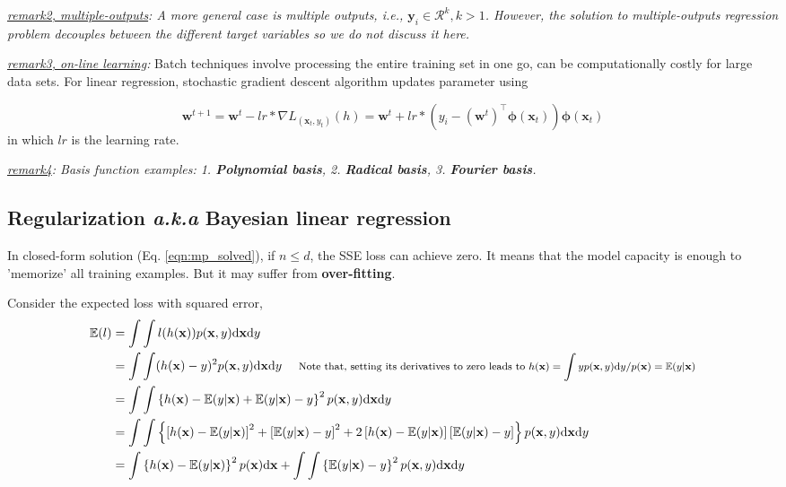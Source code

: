 \documentclass{article}
\begin{document}
	\textit{\underline{remark2, multiple-outputs}: A more general case is multiple outputs, i.e., $\mathbf{y}_i \in \mathcal{R}^k, k>1$. However, the solution to multiple-outputs regression problem decouples between the different target variables so we do not discuss it here.}
	
	\textit{\underline{remark3, on-line learning}:} Batch techniques involve processing the entire training set in one go, can be computationally costly for large data sets. For linear regression, stochastic gradient descent algorithm updates parameter using
	
	\begin{equation*}
	\mathbf{w}^{t+1}=\mathbf{w}^{t} - lr*\nabla L_{(\mathbf{x}_t,y_t)}(h) = \mathbf{w}^{t} + lr* (y_i - (\mathbf{w}^t)^\top \mathbf{\phi} (\mathbf{x}_t)) \mathbf{\phi} (\mathbf{x}_t)
	\end{equation*}
in which $lr$ is the learning rate.

	\textit{\underline{remark4}: Basis function examples: 1. \textbf{Polynomial basis}, 2. \textbf{Radical basis}, 3. \textbf{Fourier basis}.}
	
	\subsection{Regularization \textit{a.k.a} Bayesian linear regression}
	
	In closed-form solution (Eq. \ref{eqn:mp_solved}), if $n\leq d$, the SSE loss can achieve zero. It means that the model capacity is enough to 'memorize' all training examples. But it may suffer from \textbf{over-fitting}.
	
	Consider the expected loss with squared error,
	\begin{equation}
	\begin{split}
	\mathbb{E}(l) &= \int \int l(h(\mathbf{x})) p(\mathbf{x}, y) \text{d} \mathbf{x} \text{d}y \\
	&= \int \int (h(\mathbf{x})-y)^2 p(\mathbf{x}, y) \text{d} \mathbf{x} \text{d}y
	\ \ \ \ \footnotesize{\text{Note that, setting its derivatives to zero leads to $h(\mathbf{x}) = \int yp(\mathbf{x}, y) \text{d} y /p(\mathbf{x}) = \mathbb{E}(y|\mathbf{x})$}}\\
	&= \int \int \left\{ h(\mathbf{x}) - \mathbb{E} (y|\mathbf{x}) + \mathbb{E} (y|\mathbf{x}) - y \right\}^2 p(\mathbf{x}, y) \text{d} \mathbf{x} \text{d}y \\
	&= \int \int \left\{ \left[ h(\mathbf{x}) - \mathbb{E} (y|\mathbf{x}) \right]^2 + \left[\mathbb{E} (y|\mathbf{x}) - y \right]^2 + 2 \left[ h(\mathbf{x}) - \mathbb{E} (y|\mathbf{x}) \right] \left[\mathbb{E} (y|\mathbf{x}) - y \right]  \right\} p(\mathbf{x}, y) \text{d} \mathbf{x} \text{d}y \\
	&= \int \left\{ h(\mathbf{x}) - \mathbb{E} (y|\mathbf{x}) \right\}^2 p(\mathbf{x}) \text{d} \mathbf{x} + \int \int \left\{\mathbb{E} (y|\mathbf{x}) - y \right\}^2 p(\mathbf{x}, y) \text{d} \mathbf{x} \text{d} y
	\end{split}
	\end{equation}
	
\end{document}
